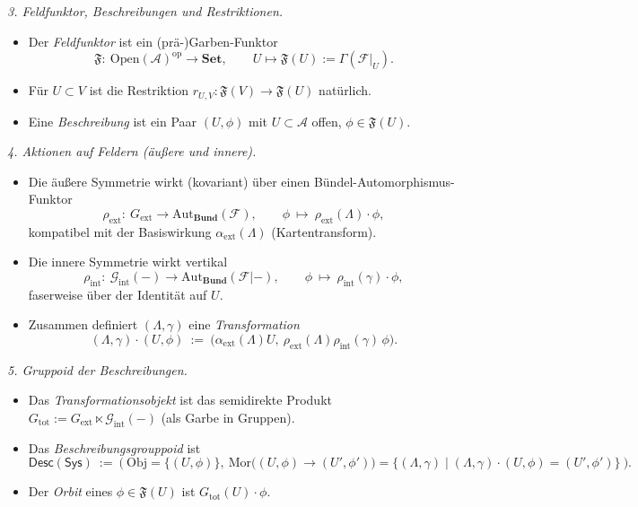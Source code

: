 \documentclass[10pt, letterpaper]{article}
\begin{document}
\bigskip
\emph{3. Feldfunktor, Beschreibungen und Restriktionen.}
\begin{itemize}
\item Der \emph{Feldfunktor} ist ein (prä-)Garben-Funktor
\[
\mathfrak F:\ \mathrm{Open}(\mathcal A)^{\mathrm{op}}\longrightarrow \mathbf{Set},\qquad
U\longmapsto \mathfrak F(U):=\Gamma(\mathcal F|_U).
\]
\item Für $U\subset V$ ist die Restriktion $r_{U,V}:\mathfrak F(V)\to \mathfrak F(U)$ natürlich.
\item Eine \emph{Beschreibung} ist ein Paar $(U,\phi)$ mit $U\subset \mathcal A$ offen, $\phi\in\mathfrak F(U)$.
\end{itemize}

\bigskip
\emph{4. Aktionen auf Feldern (äußere und innere).}
\begin{itemize}
\item Die äußere Symmetrie wirkt (kovariant) über einen Bündel-Automorphismus-Funktor
\[
\rho_{\mathrm{ext}}:\ G_{\mathrm{ext}}\longrightarrow \mathrm{Aut}_{\mathbf{Bund}}(\mathcal F),\qquad
\phi\ \mapsto\ \rho_{\mathrm{ext}}(\Lambda)\cdot \phi,
\]
kompatibel mit der Basiswirkung $\alpha_{\mathrm{ext}}(\Lambda)$ (Kartentransform).
\item Die innere Symmetrie wirkt vertikal
\[
\rho_{\mathrm{int}}:\ \mathcal G_{\mathrm{int}}(-)\longrightarrow \mathrm{Aut}_{\mathbf{Bund}}(\mathcal F|-),\qquad
\phi\ \mapsto\ \rho_{\mathrm{int}}(\gamma)\cdot \phi,
\]
faserweise über der Identität auf $U$.
\item Zusammen definiert $(\Lambda,\gamma)$ eine \emph{Transformation}
\[
(\Lambda,\gamma)\cdot (U,\phi)\ :=\ \big(\alpha_{\mathrm{ext}}(\Lambda)U,\ \rho_{\mathrm{ext}}(\Lambda)\rho_{\mathrm{int}}(\gamma)\,\phi\big).
\]
\end{itemize}

\bigskip
\emph{5. Gruppoid der Beschreibungen.}
\begin{itemize}
\item Das \emph{Transformationsobjekt} ist das semidirekte Produkt
$G_{\mathrm{tot}}:=G_{\mathrm{ext}}\ltimes \mathcal G_{\mathrm{int}}(-)$ (als Garbe in Gruppen).
\item Das \emph{Beschreibungsgrouppoid} ist
\[
\mathsf{Desc}(\mathsf{Sys})\ :=\
\Big(\ \mathrm{Obj}=\big\{(U,\phi)\big\},\ 
\mathrm{Mor}\big((U,\phi)\to(U',\phi')\big)=\big\{(\Lambda,\gamma)\mid (\Lambda,\gamma)\cdot(U,\phi)=(U',\phi')\big\}\ \Big).
\]
\item Der \emph{Orbit} eines $\phi\in\mathfrak F(U)$ ist $G_{\mathrm{tot}}(U)\cdot\phi$.
\end{itemize}
\end{document}
